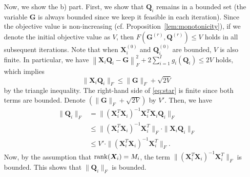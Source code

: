 \documentclass[10pt,journal]{IEEEtran}
\newcommand{\Q}{\boldsymbol{Q}}
\begin{document}
Now, we show the b) part.
First, we show that ${\bm Q}_i$ remains in a bounded set (the variable ${\bm G}$ is always bounded since we keep it feasible in each iteration). 
Since the objective value is non-increasing (cf. Proposition~\ref{lem:monotonicity}), if we denote the initial objective value as $V$, then $F({\bm G}^{(r)},{\bm Q}^{(r)}) \leq V$ holds in all subsequent iterations.  
Note that when ${\bm X}_i^{(0)}$ and ${\bm Q}_i^{(0)}$ are bounded, $V$ is also finite. 
In particular, we have $\left\| {\bm X}_i {\bm Q}_i - {\bm G} \right\|_F^2 + 2\sum_{i=1}^Ig_i(\Q_i) \leq 2V$
holds, which implies
\begin{equation}\label{eq:star}
  \| {\bm X}_i {\bm Q}_i \|_F \leq \| {\bm G} \|_F + \sqrt{2V}
\end{equation}
by the triangle inequality.
The right-hand side of \eqref{eq:star} is finite since both terms are bounded. Denote $ ( \| {\bm G} \|_F + \sqrt{2V} )$ by $V'$. Then, we have
\begin{align*}
\| {\bm Q}_i \|_F &= \| ({\bm X}_i^T{\bm X}_i)^{-1} {\bm X}_i^T{\bm X}_i {\bm Q}_i \|_F\\
&\leq \| ({\bm X}_i^T{\bm X}_i)^{-1} {\bm X}_i^T \|_F \cdot \|{\bm X}_i {\bm Q}_i \|_F\\
&\leq V' \cdot \| ({\bm X}_i^T{\bm X}_i)^{-1} {\bm X}_i^T \|_F.
\end{align*} 
Now, by the assumption that ${\rm rank}({\bm X}_i)=M_i$, the term $\| ({\bm X}_i^T{\bm X}_i)^{-1} {\bm X}_i^T \|_F$ is bounded.  This shows that $\| {\bm Q}_i \|_F$ is bounded.
\end{document}
